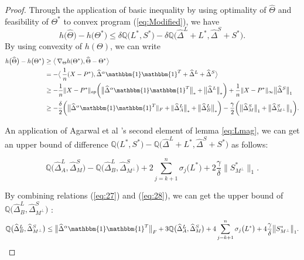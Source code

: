 \documentclass[AMS,STIX1COL]{WileyNJD-v2}
\begin{document}
{\begin{proof}
Through the application of basic inequality by using optimality of $\widehat{\Theta}$ and feasibility of $\Theta^{*}$ to convex program (\ref{eq:Modified}), we have
\begin{equation}
    h\big(\widehat{\Theta}\big) - h\big(\Theta^{*}\big)
    \leq \delta \mathbb{Q}\big(L^{*},S^{*}\big) - \delta \mathbb{Q}\big(\widehat{\Delta}^L + L^{*},\widehat{\Delta}^S + S^{*}\big).
\end{equation}
By using convexity of $h(\Theta)$, we can write
\begin{align}
    h\big(\widehat{\Theta}\big)-h\big(\Theta^{*}\big) &\geq
    \big\langle\, \nabla_{\Theta}h(\Theta^{*}),\widehat{\Theta}-\Theta^{*}\big\rangle\ \nonumber \\
    &= - \big\langle\,\frac{1}{n} (X-P^{*}), \widehat{\Delta}^{\alpha}\mathbbm{1}\mathbbm{1}^T + \widehat{\Delta}^{L} + \widehat{\Delta}^{S} \big\rangle\ \nonumber \\
    &\geq -\frac{1}{n} \|X - P^*\|_{op}\bigg(\big\|\widehat{\Delta}^{\alpha}\mathbbm{1}\mathbbm{1}^T\big\|_\ast + \big\|\widehat{\Delta}^{L}\big\|_\ast\bigg) +  \frac{1}{n} \|X - P^*\|_{\infty}\big\|\widehat{\Delta}^{S}\big\|_{1} \nonumber \\
    &\geq -\frac{\delta}{2}\bigg(\big\|\widehat{\Delta}^{\alpha}\mathbbm{1}\mathbbm{1}^T\|_F + \|\widehat{\Delta}^{L}_{A}\big\|_\ast + \big\|\widehat{\Delta}^{L}_{B}\big\|_\ast\bigg) - \frac{\gamma}{2} \bigg(\big\|\widehat{\Delta}^{S}_{M}\big\|_{1} +
    \big\|\widehat{\Delta}^{S}_{M^\perp}\big\|_{1}\bigg). \label{eq:27}
\end{align}

An application of Agarwal et al \cite{agarwal2012noisy}'s second element of lemma \ref{eq:Lmag},
we can get an upper bound of difference $\mathbb{Q}\big(L^*,S^*\big)- \mathbb{Q}\big(\widehat{\Delta}^L + L^{*},\widehat{\Delta}^S + S^{*}\big)$ as follows:

\begin{equation} \label{eq:28}
    \mathbb{Q}\big(\widehat{\Delta}^L_{A},\widehat{\Delta}^S_{M}\big) - \mathbb{Q}\big(\widehat{\Delta}^L_{B},\widehat{\Delta}^S_{M^\perp}\big)
    +2 \sum_{j=k+1}^{n} \sigma_{j}\big(L^*\big) + 2\frac{\gamma}{\delta}\big\|S^*_{M^\perp}\big\|_{1}.
\end{equation}

By combining relations (\ref{eq:27}) and (\ref{eq:28}), we can get the upper bound of $\mathbb{Q}\big(\widehat{\Delta}^L_{B},\widehat{\Delta}^S_{M^\perp}\big)$ :
\begin{align*}
    \mathbb{Q}\big(\widehat{\Delta}^L_{B},\widehat{\Delta}^S_{M^\perp}\big) \leq
    \big\|\widehat{\Delta}^{\alpha}\mathbbm{1}\mathbbm{1}^T\big\|_{F} +
    3\mathbb{Q}\big(\widehat{\Delta}^{L}_{A},\widehat{\Delta}^{S}_{M}\big)+4 \sum_{j=k+1}^{n} \sigma_{j}\big(L^{*}\big) + 4\frac{\gamma}{\delta}
    \big\|S^{*}_{M^\perp}\big\|_{1}.
\end{align*}
\end{proof}

}
\end{document}
